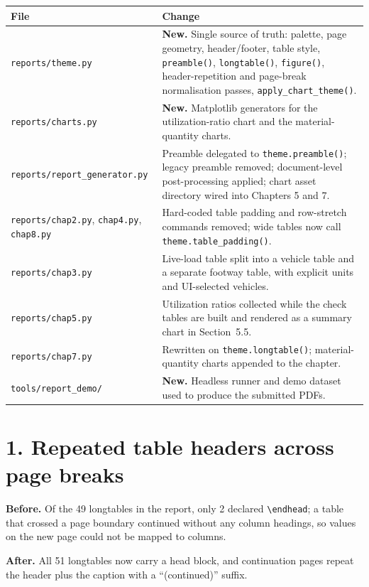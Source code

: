 \documentclass[11pt,a4paper]{article}
\newcommand{\code}[1]{\texttt{\small #1}}
\begin{document}
\begin{longtable}{@{}>{\raggedright\arraybackslash}p{6.0cm}>{\raggedright\arraybackslash}p{9.8cm}@{}}
\toprule
\textbf{File} & \textbf{Change} \\
\midrule
\endhead
\code{reports/theme.py} & \textbf{New.} Single source of truth: palette, page
geometry, header/footer, table style, \code{preamble()}, \code{longtable()},
\code{figure()}, header-repetition and page-break normalisation passes,
\code{apply\_chart\_theme()}. \\
\code{reports/charts.py} & \textbf{New.} Matplotlib generators for the
utilization-ratio chart and the material-quantity charts. \\
\code{reports/report\_generator.py} & Preamble delegated to \code{theme.preamble()};
legacy preamble removed; document-level post-processing applied; chart asset
directory wired into Chapters 5 and 7. \\
\code{reports/chap2.py}, \code{chap4.py}, \code{chap8.py} & Hard-coded table
padding and row-stretch commands removed; wide tables now call
\code{theme.table\_padding()}. \\
\code{reports/chap3.py} & Live-load table split into a vehicle table and a separate
footway table, with explicit units and UI-selected vehicles. \\
\code{reports/chap5.py} & Utilization ratios collected while the check tables are
built and rendered as a summary chart in Section~5.5. \\
\code{reports/chap7.py} & Rewritten on \code{theme.longtable()}; material-quantity
charts appended to the chapter. \\
\code{tools/report\_demo/} & \textbf{New.} Headless runner and demo dataset used to
produce the submitted PDFs. \\
\bottomrule
\end{longtable}

\section{1. Repeated table headers across page breaks}

\textbf{Before.} Of the 49 longtables in the report, only 2 declared
\code{\textbackslash endhead}; a table that crossed a page boundary continued
without any column headings, so values on the new page could not be mapped to
columns.

\textbf{After.} All 51 longtables now carry a head block, and continuation pages
repeat the header plus the caption with a ``(continued)'' suffix.
\end{document}
